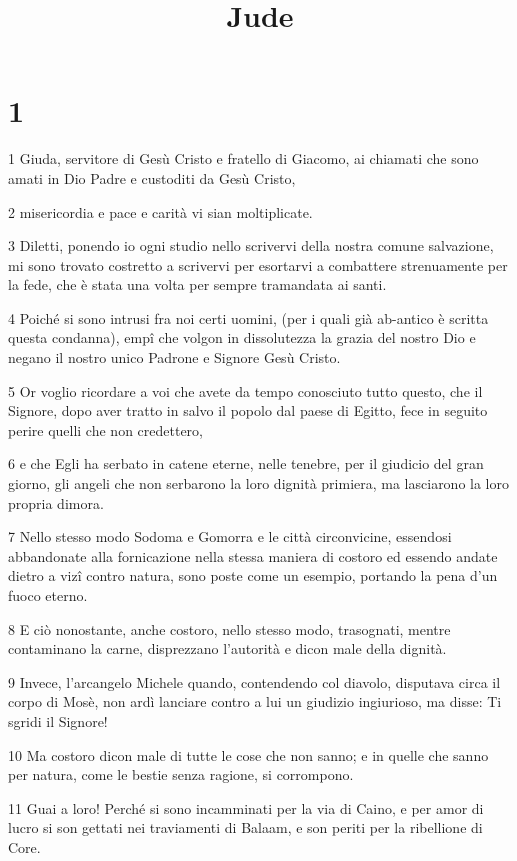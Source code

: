 

\title{Jude}


\chapter{1}

\par 1 Giuda, servitore di Gesù Cristo e fratello di Giacomo, ai chiamati che sono amati in Dio Padre e custoditi da Gesù Cristo,
\par 2 misericordia e pace e carità vi sian moltiplicate.
\par 3 Diletti, ponendo io ogni studio nello scrivervi della nostra comune salvazione, mi sono trovato costretto a scrivervi per esortarvi a combattere strenuamente per la fede, che è stata una volta per sempre tramandata ai santi.
\par 4 Poiché si sono intrusi fra noi certi uomini, (per i quali già ab-antico è scritta questa condanna), empî che volgon in dissolutezza la grazia del nostro Dio e negano il nostro unico Padrone e Signore Gesù Cristo.
\par 5 Or voglio ricordare a voi che avete da tempo conosciuto tutto questo, che il Signore, dopo aver tratto in salvo il popolo dal paese di Egitto, fece in seguito perire quelli che non credettero,
\par 6 e che Egli ha serbato in catene eterne, nelle tenebre, per il giudicio del gran giorno, gli angeli che non serbarono la loro dignità primiera, ma lasciarono la loro propria dimora.
\par 7 Nello stesso modo Sodoma e Gomorra e le città circonvicine, essendosi abbandonate alla fornicazione nella stessa maniera di costoro ed essendo andate dietro a vizî contro natura, sono poste come un esempio, portando la pena d'un fuoco eterno.
\par 8 E ciò nonostante, anche costoro, nello stesso modo, trasognati, mentre contaminano la carne, disprezzano l'autorità e dicon male della dignità.
\par 9 Invece, l'arcangelo Michele quando, contendendo col diavolo, disputava circa il corpo di Mosè, non ardì lanciare contro a lui un giudizio ingiurioso, ma disse: Ti sgridi il Signore!
\par 10 Ma costoro dicon male di tutte le cose che non sanno; e in quelle che sanno per natura, come le bestie senza ragione, si corrompono.
\par 11 Guai a loro! Perché si sono incamminati per la via di Caino, e per amor di lucro si son gettati nei traviamenti di Balaam, e son periti per la ribellione di Core.
